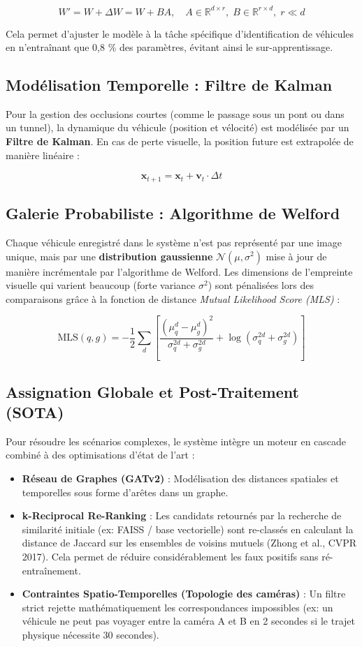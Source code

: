 \documentclass[12pt, a4paper]{article}
\begin{document}
$$ W' = W + \Delta W = W + BA, \quad A \in \mathbb{R}^{d \times r},\; B \in \mathbb{R}^{r \times d},\; r \ll d $$

Cela permet d'ajuster le modèle à la tâche spécifique d'identification de véhicules en n'entraînant que 0,8 \% des paramètres, évitant ainsi le sur-apprentissage.

\subsection{Modélisation Temporelle : Filtre de Kalman}
Pour la gestion des occlusions courtes (comme le passage sous un pont ou dans un tunnel), la dynamique du véhicule (position et vélocité) est modélisée par un \textbf{Filtre de Kalman}. En cas de perte visuelle, la position future est extrapolée de manière linéaire :

$$ \mathbf{x}_{t+1} = \mathbf{x}_t + \mathbf{v}_t \cdot \Delta t $$

\subsection{Galerie Probabiliste : Algorithme de Welford}
Chaque véhicule enregistré dans le système n'est pas représenté par une image unique, mais par une \textbf{distribution gaussienne} $\mathcal{N}(\mu, \sigma^2)$ mise à jour de manière incrémentale par l'algorithme de Welford. Les dimensions de l'empreinte visuelle qui varient beaucoup (forte variance $\sigma^2$) sont pénalisées lors des comparaisons grâce à la fonction de distance \textit{Mutual Likelihood Score (MLS)} :

$$ \text{MLS}(q, g) = -\frac{1}{2} \sum_d \left[ \frac{(\mu_q^d - \mu_g^d)^2}{\sigma_q^{2d} + \sigma_g^{2d}} + \log(\sigma_q^{2d} + \sigma_g^{2d}) \right] $$

\subsection{Assignation Globale et Post-Traitement (SOTA)}
Pour résoudre les scénarios complexes, le système intègre un moteur en cascade combiné à des optimisations d'état de l'art :
\begin{itemize}
    \item \textbf{Réseau de Graphes (GATv2)} : Modélisation des distances spatiales et temporelles sous forme d'arêtes dans un graphe.
    \item \textbf{k-Reciprocal Re-Ranking} : Les candidats retournés par la recherche de similarité initiale (ex: FAISS / base vectorielle) sont re-classés en calculant la distance de Jaccard sur les ensembles de voisins mutuels (Zhong et al., CVPR 2017). Cela permet de réduire considérablement les faux positifs sans ré-entraînement.
    \item \textbf{Contraintes Spatio-Temporelles (Topologie des caméras)} : Un filtre strict rejette mathématiquement les correspondances impossibles (ex: un véhicule ne peut pas voyager entre la caméra A et B en 2 secondes si le trajet physique nécessite 30 secondes).
\end{itemize}
\end{document}
